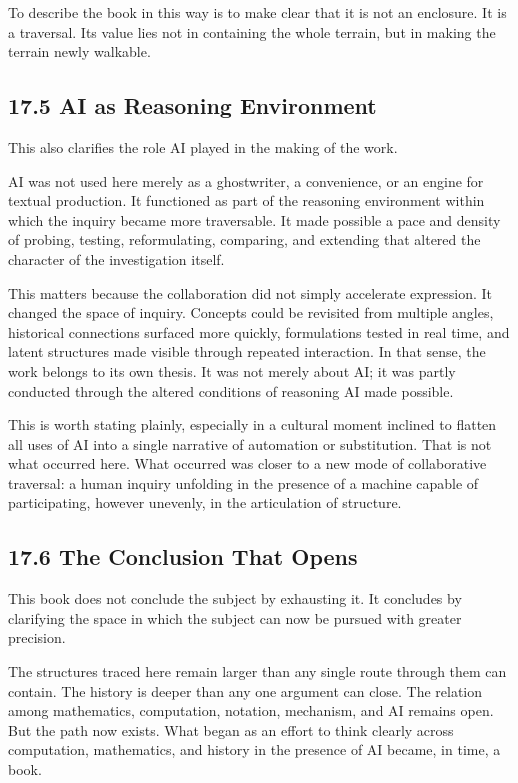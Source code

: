 To describe the book in this way is to make clear that it is not an
enclosure. It is a traversal. Its value lies not in containing the whole
terrain, but in making the terrain newly walkable.

\hypertarget{ai-as-reasoning-environment}{%
\subsection{17.5 AI as Reasoning
Environment}\label{ai-as-reasoning-environment}}

This also clarifies the role AI played in the making of the work.

AI was not used here merely as a ghostwriter, a convenience, or an
engine for textual production. It functioned as part of the reasoning
environment within which the inquiry became more traversable. It made
possible a pace and density of probing, testing, reformulating,
comparing, and extending that altered the character of the investigation
itself.

This matters because the collaboration did not simply accelerate
expression. It changed the space of inquiry. Concepts could be revisited
from multiple angles, historical connections surfaced more quickly,
formulations tested in real time, and latent structures made visible
through repeated interaction. In that sense, the work belongs to its own
thesis. It was not merely about AI; it was partly conducted through the
altered conditions of reasoning AI made possible.

This is worth stating plainly, especially in a cultural moment inclined
to flatten all uses of AI into a single narrative of automation or
substitution. That is not what occurred here. What occurred was closer
to a new mode of collaborative traversal: a human inquiry unfolding in
the presence of a machine capable of participating, however unevenly, in
the articulation of structure.

\hypertarget{the-conclusion-that-opens}{%
\subsection{17.6 The Conclusion That
Opens}\label{the-conclusion-that-opens}}

This book does not conclude the subject by exhausting it. It concludes
by clarifying the space in which the subject can now be pursued with
greater precision.

The structures traced here remain larger than any single route through
them can contain. The history is deeper than any one argument can close.
The relation among mathematics, computation, notation, mechanism, and AI
remains open. But the path now exists. What began as an effort to think
clearly across computation, mathematics, and history in the presence of
AI became, in time, a book.

